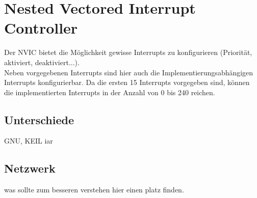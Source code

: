 \chapter{Nested Vectored Interrupt Controller}
Der NVIC bietet die M\"oglichkeit gewisse Interrupts zu konfigurieren
(Priorit\"at, aktiviert, deaktiviert...). \\
Neben vorgegebenen Interrupts sind hier auch die Implementierungsabh\"angigen
Interrupts konfigurierbar. Da die ersten 15 Interrupts vorgegeben sind, k\"onnen
die implementierten Interrupts in der Anzahl von 0 bis 240 reichen.

\section{Unterschiede}
GNU, KEIL iar

\section{Netzwerk}
was sollte zum besseren verstehen hier einen platz finden.
